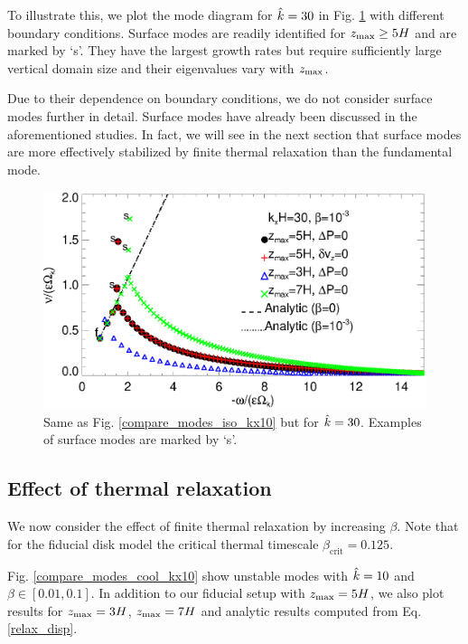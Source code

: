 To illustrate this, we plot the mode diagram for $\hat{k}=30$ in  
Fig. \ref{compare_modes_iso_kx30} with different boundary 
conditions. Surface modes are readily identified for 
$z_\mathrm{max}\geq 5H$ and are marked by `s'. They have the largest growth
rates but require sufficiently large vertical domain size and their
eigenvalues vary with $z_\mathrm{max}$.   

Due to their dependence on boundary conditions, we 
do not consider surface modes further in detail. Surface modes have
already been discussed in the aforementioned studies. In fact, we will
see in the next section that surface modes are more effectively
stabilized by finite thermal relaxation than the fundamental mode. %

\begin{figure}
  \includegraphics[width=\linewidth]{figures/compare_modes_iso_kx30_analytic.ps}
  \caption{Same as Fig. \ref{compare_modes_iso_kx10} but for $\hat{k}=30$. Examples of surface modes are
    marked by `s'. \label{compare_modes_iso_kx30}
  }
\end{figure}


\subsection{Effect of thermal relaxation}\label{therm_relax_eff}
We now consider the effect of finite thermal relaxation by increasing 
$\beta$. Note that for the fiducial disk model the critical thermal 
timescale $\beta_\mathrm{crit} = 0.125$.  

Fig. \ref{compare_modes_cool_kx10} show unstable modes with $\hat{k}=10$ 
and $\beta\in[0.01,0.1]$. In addition to our fiducial setup with 
$z_\mathrm{max}=5H$, we also plot results for $z_\mathrm{max}=3H$, $z_\mathrm{max}=7H$ and 
analytic results computed from Eq. \ref{relax_disp}.  

